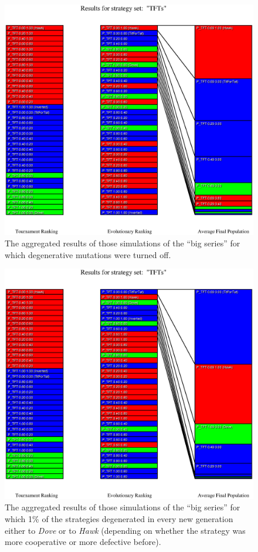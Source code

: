 \begin{figure}
\begin{center}
\includegraphics[width=20cm]{tables/TFTs_D0.000.eps}
\caption{\label{TFTs_D0000} The aggregated results of those
simulations of the ``big series'' for which degenerative mutations were turned
off.}
\end{center}
\end{figure}

\begin{figure}
\begin{center}
\includegraphics[width=20cm]{tables/TFTs_D0.010.eps}
\caption{\label{TFTs_D0010} The aggregated results of those
simulations of the ``big series'' for which 1\% of the strategies degenerated
in every new generation either to {\em Dove} or to {\em Hawk} (depending on
whether the strategy was more cooperative or more defective before).}
\end{center}
\end{figure}

